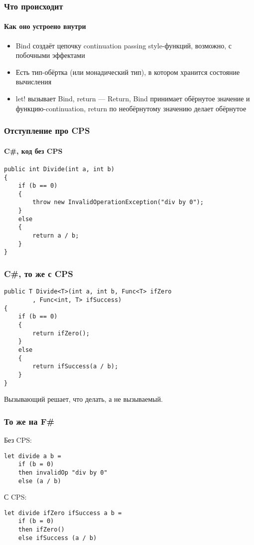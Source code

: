 \documentclass[xetex,mathserif,serif]{beamer}
\begin{document}
    \begin{frame}
        \frametitle{Что происходит}
        \framesubtitle{Как оно устроено внутри}
        \begin{itemize}
            \item Bind создаёт цепочку continuation passing style-функций, возможно, с побочными эффектами
            \item Есть тип-обёртка (или монадический тип), в котором хранится состояние вычисления
            \item let! вызывает Bind, return --- Return, Bind принимает обёрнутое значение и функцию-continuation, return по необёрнутому значению делает обёрнутое
        \end{itemize}
    \end{frame}

    \begin{frame}[fragile]
        \frametitle{Отступление про CPS}
        \framesubtitle{C\#, код без CPS}
        \begin{verbatim}
public int Divide(int a, int b)
{
    if (b == 0)
    {
        throw new InvalidOperationException("div by 0");
    }
    else
    {
        return a / b;
    }
}
        \end{verbatim}
    \end{frame}

    \begin{frame}[fragile]
        \frametitle{C\#, то же с CPS}
        \begin{verbatim}
public T Divide<T>(int a, int b, Func<T> ifZero
        , Func<int, T> ifSuccess)
{
    if (b == 0)
    {
        return ifZero();
    }
    else
    {
        return ifSuccess(a / b);
    }
}
        \end{verbatim}
        Вызывающий решает, что делать, а не вызываемый.
    \end{frame}

    \begin{frame}[fragile]
        \frametitle{То же на F\#}
        Без CPS:
        \begin{verbatim}
let divide a b =
    if (b = 0) 
    then invalidOp "div by 0"
    else (a / b)
        \end{verbatim}
        С CPS:
        \begin{verbatim}
let divide ifZero ifSuccess a b = 
    if (b = 0) 
    then ifZero()
    else ifSuccess (a / b)
        \end{verbatim}
    \end{frame}
\end{document}
